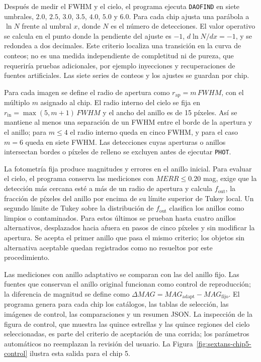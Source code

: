 \documentclass[12pt,letterpaper,oneside]{book}
\begin{document}
Después de medir el FWHM y el cielo, el programa ejecuta \texttt{DAOFIND} en siete umbrales, $2.0$, $2.5$, $3.0$, $3.5$, $4.0$, $5.0$ y $6.0$. Para cada chip ajusta una parábola a $\ln N$ frente al umbral $x$, donde $N$ es el número de detecciones. El valor operativo se calcula en el punto donde la pendiente del ajuste es $-1$, $d\ln N/dx=-1$, y se redondea a dos decimales. Este criterio localiza una transición en la curva de conteos; no es una medida independiente de completitud ni de pureza, que requeriría pruebas adicionales, por ejemplo inyecciones y recuperaciones de fuentes artificiales. Las siete series de conteos y los ajustes se guardan por chip.

Para cada imagen se define el radio de apertura como $r_{\mathrm{ap}}=m\,FWHM$, con el múltiplo $m$ asignado al chip. El radio interno del cielo se fija en $r_{\mathrm{in}}=\max(5,m+1)\,FWHM$ y el ancho del anillo es de 15 píxeles. Así se mantiene al menos una separación de un FWHM entre el borde de la apertura y el anillo; para $m\leq4$ el radio interno queda en cinco FWHM, y para el caso $m=6$ queda en siete FWHM. Las detecciones cuyas aperturas o anillos intersectan bordes o píxeles de relleno se excluyen antes de ejecutar \texttt{PHOT}.

La fotometría fija produce magnitudes y errores en el anillo inicial. Para evaluar el cielo, el programa conserva las mediciones con $MERR\leq0.20$ mag, exige que la detección más cercana esté a más de un radio de apertura y calcula $f_{\mathrm{out}}$, la fracción de píxeles del anillo por encima de su límite superior de Tukey local. Un segundo límite de Tukey sobre la distribución de $f_{\mathrm{out}}$ clasifica los anillos como limpios o contaminados. Para estos últimos se prueban hasta cuatro anillos alternativos, desplazados hacia afuera en pasos de cinco píxeles y sin modificar la apertura. Se acepta el primer anillo que pasa el mismo criterio; los objetos sin alternativa aceptable quedan registrados como no resueltos por este procedimiento.

Las mediciones con anillo adaptativo se comparan con las del anillo fijo. Las fuentes que conservan el anillo original funcionan como control de reproducción; la diferencia de magnitud se define como $\Delta MAG=MAG_{\mathrm{adapt}}-MAG_{\mathrm{fijo}}$. El programa genera para cada chip los catálogos, las tablas de selección, las imágenes de control, las comparaciones y un resumen JSON. La inspección de la figura de control, que muestra las quince estrellas y las quince regiones del cielo seleccionadas, es parte del criterio de aceptación de una corrida; los parámetros automáticos no reemplazan la revisión del usuario. La Figura~\ref{fig:sextans-chip5-control} ilustra esta salida para el chip 5.
\end{document}
